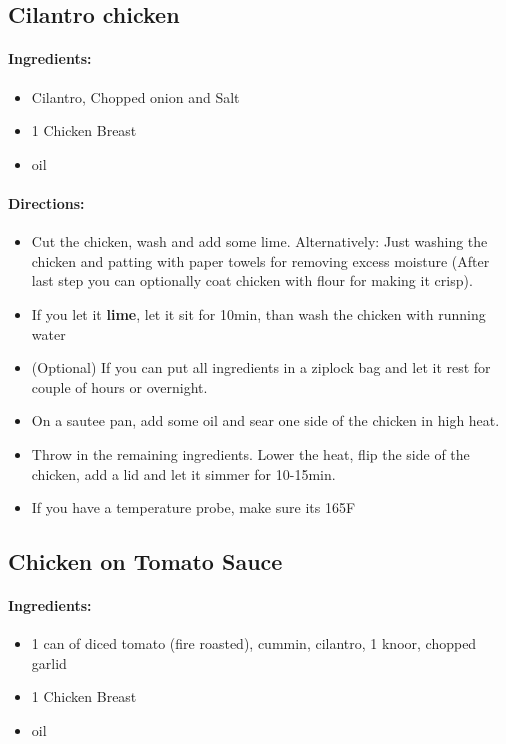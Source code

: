 \documentclass{article}
\begin{document}
\subsection{Cilantro chicken}

\paragraph{Ingredients:}
\begin{itemize}
    \item Cilantro, Chopped onion and Salt
    \item 1 Chicken Breast
    \item oil
\end{itemize}

\paragraph{Directions:}
\begin{itemize}
    \item Cut the chicken, wash and add some lime. Alternatively: Just washing the chicken and patting with paper towels for removing excess moisture (After last step you can optionally coat chicken with flour for making it crisp).
    \item If you let it \textbf{lime}, let it sit for 10min, than wash the chicken with running water
    \item (Optional) If you can put all ingredients in a ziplock bag and let it rest for couple of hours or overnight.
    \item On a sautee pan, add some oil and sear one side of the chicken in high heat.
    \item Throw in the remaining ingredients. Lower the heat, flip the side of the chicken, add a lid and let it simmer for 10-15min.
    \item If you have a temperature probe, make sure its 165F
\end{itemize}

\subsection{Chicken on Tomato Sauce}

\paragraph{Ingredients:}
\begin{itemize}
    \item 1 can of diced tomato (fire roasted), cummin, cilantro, 1 knoor, chopped garlid
    \item 1 Chicken Breast
    \item oil
\end{itemize}
\end{document}
